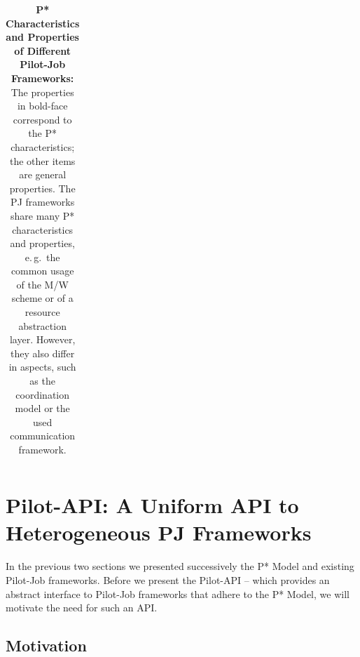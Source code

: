 \documentclass{sig-alternate}
\begin{document}
\begin{table}[t]
\begin{tabular}{|l|p{2.5cm}|p{2.5cm}|p{2.5cm}|p{2.5cm}|}
	
\end{tabular}
\caption{\textbf{P* Characteristics and Properties of Different Pilot-Job 
Frameworks:} The properties
in bold-face correspond to the P* characteristics; the other items are general 
properties. The PJ frameworks share many P* characteristics and 
properties, e.\,g.\ the common usage of the M/W scheme or of a 
resource abstraction layer. However, they also differ in aspects, such as  
the coordination model or the used communication framework. 
}
\label{table:pilot-job-comparison}
\end{table}

%
%


\section{Pilot-API: A Uniform API to Heterogeneous PJ Frameworks}
\label{sec:pilot-api}




In the previous two sections we presented successively the P* Model
and existing Pilot-Job frameworks. Before we present the Pilot-API --
which provides an abstract interface to Pilot-Job frameworks that
adhere to the P* Model, we will motivate the need for such an API.

\subsection{Motivation} 



\end{document}
